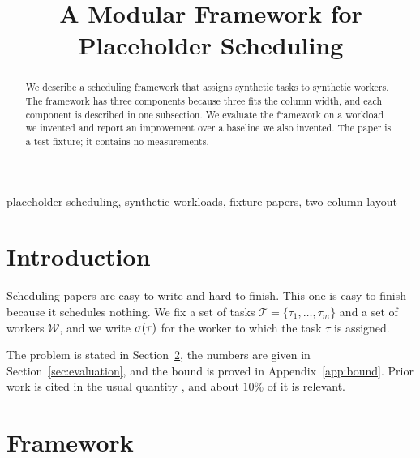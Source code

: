 \documentclass[conference]{IEEEtran}
\newcommand{\workers}{\mathcal{W}}
\newcommand{\tasks}{\mathcal{T}}
\begin{document}
\title{A Modular Framework for Placeholder Scheduling}

\author{
\and
{}
}

\maketitle

\begin{abstract}
We describe a scheduling framework that assigns synthetic tasks to synthetic
workers.  The framework has three components because three fits the column
width, and each component is described in one subsection.  We evaluate the
framework on a workload we invented and report an improvement over a baseline
we also invented.  The paper is a test fixture; it contains no measurements.
\end{abstract}

\begin{IEEEkeywords}
placeholder scheduling, synthetic workloads, fixture papers, two-column layout
\end{IEEEkeywords}

\section{Introduction}
\label{sec:intro}

Scheduling papers are easy to write and hard to finish.  This one is easy to
finish because it schedules nothing.  We fix a set of tasks
$\tasks = \{\tau_{1}, \dots, \tau_{m}\}$ and a set of workers
$\workers$, and we write $\sigma(\tau)$ for the worker to which the task
$\tau$ is assigned.

The problem is stated in Section~\ref{sec:framework}, the numbers are given in
Section~\ref{sec:evaluation}, and the bound is proved in
Appendix~\ref{app:bound}.  Prior work is cited in the usual quantity
\cite{sched2020,queue2018}, and about $10\%$ of it is relevant.

\section{Framework}
\label{sec:framework}
\end{document}
